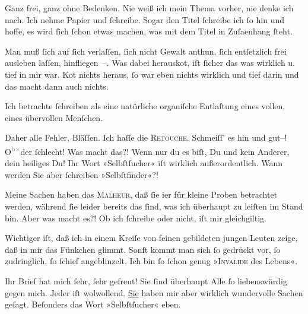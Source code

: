 \pstart
           Ganz frei, ganz ohne Bedenken. Nie weiß ich mein Thema vorher, nie denke ich nach.
               Ich nehme Papier und{ }ſchreibe. Sogar den Titel{ }ſchreibe ich{ }ſo hin und hoffe, es wird{ }ſich{ }ſchon etwas machen, was mit dem Titel in Zuſa{\geminationm}enhang{ }ſteht.\pend
           
\pstart
           Man muß{ }ſich auf{ }ſich verlaſſen,{ }ſich nicht Gewalt anthun,{ }ſich entſetzlich frei
               ausleben laſſen, hinfliegen –. {\pb}Was dabei herausko{\geminationm}t, iſt{ }ſicher das was wirklich u. tief in mir war. Ko{\geminationm}t nichts heraus,{ }ſo war eben nichts wirklich und tief
               darin und das macht dann auch nichts.\pend
           
\pstart
           Ich betrachte{ }ſchreiben als eine natürliche organiſche Entlaſtung eines vollen, eines
               übervollen Menſchen.\pend
           
\pstart
           Daher alle \strikeout{\textcolor{gray}{meine}} Fehler, Bläſſen. Ich haſſe die \textsc{Retouche}. Schmeiſſ’
               es hin und gut–! O\substVorne{}\textsuperscript{\textcolor{gray}{b}\textcolor{gray}{×}}\substDazwischen{}de\substHinten{}r{ }ſchlecht! Was macht das?! Wenn nur du es biſt, Du und kein Anderer, dein
               heiliges Du! Ihr Wort »Selbſtſucher« iſt wirklich {\pb}außerordentlich. Wann werden Sie aber{ }ſchreiben »Selbſtfinder«?!\pend
           
\pstart
            Meine Sachen haben das \textsc{Malheur}, daß{ }ſie i{\geminationm}er für
               kleine Proben betrachtet werden, während{ }ſie leider bereits das{ }ſind, was ich
               überhaupt zu leiſten im Stand bin. Aber was macht es?! Ob ich{ }ſchreibe oder nicht,
               iſt mir gleichgiltig.\pend
           
\pstart
           Wichtiger iſt, daß ich in einem Kreiſe von feinen gebildeten jungen Leuten zeige, daß
                   in mir das Fünkchen glimmt. Sonſt kommt man sich{ }ſo gedrückt vor,{ }ſo
               zudringlich,{ }ſo{ }ſchief angeblinzelt. Ich bin{ }ſo{ }ſchon genug »\textsc{Invalide} des Lebens«.\pend
           
\pstart
           Ihr Brief hat mich{ }ſehr,{ }ſehr gefreut! {\pb} Sie{ }ſind überhaupt Alle{ }ſo liebenswürdig gegen mich. Jeder iſt wolwollend. \uline{Sie} haben mir aber wirklich wundervolle Sachen geſagt.
               Beſonders das Wort »Selbſtſucher« eben.\pend
           
